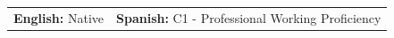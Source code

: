 
\noindent
\begin{tabularx}{\linewidth}{@{}X X@{}}
  \textbf{English:} Native &
  \textbf{Spanish:} C1 - Professional Working Proficiency \\
\end{tabularx}